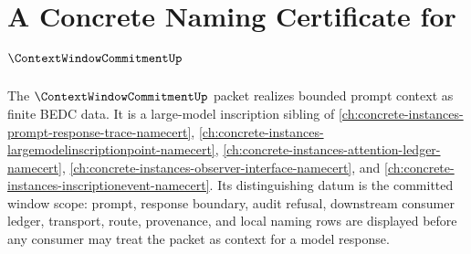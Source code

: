\chapter{A Concrete Naming Certificate for $\ContextWindowCommitmentUp$}
\label{ch:concrete-instances-contextwindowcommitment-namecert}

The $\ContextWindowCommitmentUp$ packet realizes bounded prompt context as finite BEDC data. It is a large-model inscription sibling of \autoref{ch:concrete-instances-prompt-response-trace-namecert}, \autoref{ch:concrete-instances-largemodelinscriptionpoint-namecert}, \autoref{ch:concrete-instances-attention-ledger-namecert}, \autoref{ch:concrete-instances-observer-interface-namecert}, and \autoref{ch:concrete-instances-inscriptionevent-namecert}. Its distinguishing datum is the committed window scope: prompt, response boundary, audit refusal, downstream consumer ledger, transport, route, provenance, and local naming rows are displayed before any consumer may treat the packet as context for a model response.

